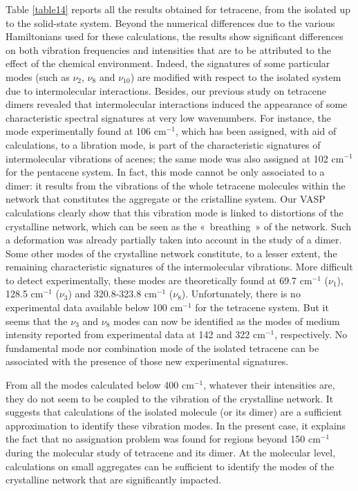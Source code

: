  Table \ref{table14} reports all the results obtained for tetracene, from the isolated up to the solid-state system. Beyond the numerical differences due to the various Hamiltonians used for these calculations, the results show significant differences on both vibration frequencies and intensities that are to be attributed to the effect of the chemical environment. Indeed, the signatures of some particular modes (such as $\nu_{2}$, $\nu_{8}$ and $\nu_{10}$) are modified with respect to the isolated system due to intermolecular interactions. Besides, our previous study on tetracene dimers revealed that intermolecular interactions induced the appearance of some characteristic spectral signatures at very low wavenumbers. For instance, the mode experimentally found at 106 cm$^{-1}$, which has been assigned, with aid of calculations, to a libration mode, is part of the characteristic signatures of intermolecular vibrations of acenes; the same mode was also assigned at 102 cm$^{-1}$ for the pentacene system. In fact, this mode cannot be only associated to a dimer: it results from the vibrations of the whole tetracene molecules within the network that constitutes the aggregate or the cristalline system. Our VASP calculations clearly show that this vibration mode is linked to distortions of the  crystalline network, which can be seen as the « breathing » of the network. Such a deformation was already partially taken into account in the study of a dimer. Some other modes of the crystalline network constitute, to a lesser extent, the remaining characteristic signatures of the intermolecular vibrations. More difficult to detect experimentally, these modes are theoretically found at 69.7 cm$^{-1}$ ($\nu_{1}$), 128.5 cm$^{-1}$ ($\nu_{3}$) and 320.8-323.8 cm$^{-1}$ ($\nu_{8}$). Unfortunately, there is no experimental data available below 100 cm$^{-1}$ for the tetracene system. But it seems that the $\nu_{3}$ and $\nu_{8}$ modes can now be identified as the modes of medium intensity reported from experimental data at 142 and 322 cm$^{-1}$, respectively. No fundamental mode nor combination mode of the isolated tetracene can be associated with the presence of those new experimental signatures.
 
 From all the modes calculated below 400 cm$^{-1}$, whatever their intensities are, they do not seem to be coupled to the vibration of the crystalline network. It suggests that calculations of the isolated molecule (or its dimer) are a sufficient approximation to identify these vibration modes. In the present case, it explains the fact that no assignation problem was found for regions beyond 150 cm$^{-1}$ during the molecular study of tetracene and its dimer. At the molecular level, calculations on small aggregates can be sufficient to identify the modes of the crystalline network that are significantly impacted.
 
